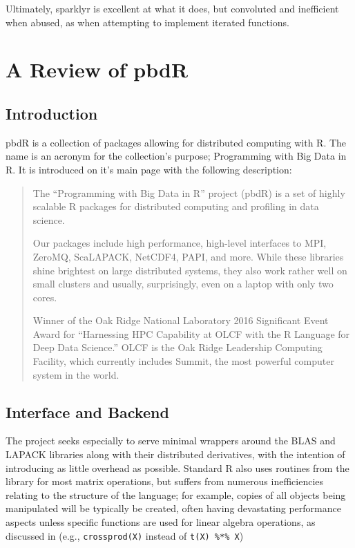 \documentclass[a4paper,10pt]{article}
\begin{document}
Ultimately, sparklyr is excellent at what it does, but convoluted and inefficient when
abused, as when attempting to implement iterated functions.

\section{A Review of pbdR}

\subsection{Introduction}
\label{sec:pbdr}

pbdR is a collection of packages allowing for distributed computing with
R\cite{pbdBASEpackage}. The name is an acronym for the collection's purpose;
Programming with Big Data in R. It is introduced on it's main page with the
following description:
\begin{quote}
	The ``Programming with Big Data in R'' project (pbdR) is a set of highly scalable
	R packages for distributed computing and profiling in data science.

	Our packages include high performance, high-level interfaces to MPI, ZeroMQ,
	ScaLAPACK, NetCDF4, PAPI, and more. While these libraries shine brightest on
	large distributed systems, they also work rather well on small clusters and
	usually, surprisingly, even on a laptop with only two cores.

	Winner of the Oak Ridge National Laboratory 2016 Significant Event Award for
	``Harnessing HPC Capability at OLCF with the R Language for Deep Data Science.''
	OLCF is the Oak Ridge Leadership Computing Facility, which currently includes
	Summit, the most powerful computer system in the world.\cite{pbdR2012}
\end{quote}

\subsection{Interface and Backend}

The project seeks especially to serve minimal wrappers around the BLAS and LAPACK
libraries along with their distributed derivatives, with the intention of
introducing as little overhead as possible.  Standard R also uses routines from
the library for most matrix operations, but suffers from numerous
inefficiencies relating to the structure of the language; for example, copies
of all objects being manipulated will be typically be created, often having
devastating performance aspects unless specific functions are used for linear
algebra operations, as discussed in \citeauthor{schmidt2017programming} (e.g.,
\texttt{crossprod(X)} instead of \texttt{t(X) \%*\% X})
\end{document}
